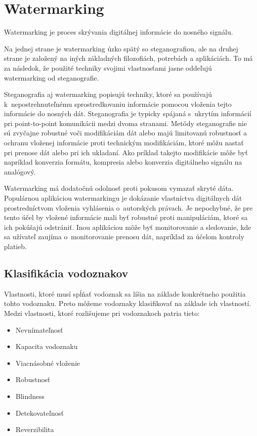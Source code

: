 \chapter{Watermarking}
\label{ch-watermarking}
Watermarking je proces skrývania digitálnej informácie do nosného signálu.

Na jednej strane je watermarking úzko spätý so steganografiou, ale na druhej strane je založený na iných základných filozofiách, potrebách a aplikáciách. To má za následok, že použité techniky svojimi vlastnosťami jasne oddeľujú watermarking od steganografie.

Steganografia aj watermarking popisujú techniky, ktoré sa používajú k~nepostrehnuteľnému sprostredkovaniu informácie pomocou vloženia tejto informácie do nosných dát. Steganografia je typicky spájaná s~ukrytím informácií pri point-to-point komunikácii medzi dvoma stranami. Metódy steganografie nie sú zvyčajne robustné voči modifikáciám dát alebo majú limitovanú robustnosť a ochranu vloženej informácie proti technickým modifikáciám, ktoré môžu nastať pri prenose dát alebo pri ich ukladaní. Ako príklad takejto modifikácie môže byť napríklad konverzia formátu, kompresia alebo konverzia digitálneho signálu na analógový.

Watermarking má dodatočnú odolnosť proti pokusom vymazať skryté dáta. Populárnou aplikáciou watermarkingu je dokázanie vlastníctva digitálnych dát prostredníctvom vloženia vyhlásenia o~autorských právach. Je nepochybné, že pre tento účel by vložené informácie mali byť  robustné proti manipuláciám, ktoré sa ich pokúšajú odstrániť. Inou aplikáciou môže byť monitorovanie a sledovanie, kde sa užívateľ zaujíma o~monitorovanie prenosu dát, napríklad za účelom kontroly platieb. \cite{Katzenbeisser}

\section{Klasifikácia vodoznakov}
Vlastnosti, ktoré musí spĺňať vodoznak sa líšia na základe konkrétneho použitia tohto vodoznaku. Preto môžeme vodoznaky klasifikovať na základe ich vlastností. Medzi vlastnosti, ktoré rozlišujeme pri vodoznakoch patria tieto:

\begin{itemize}
\item Nevnímateľnosť
\item Kapacita vodoznaku
\item Viacnásobné vloženie
\item Robustnosť
\item Blindness
\item Detekovateľnosť
\item Reverzibilita
\end{itemize}

